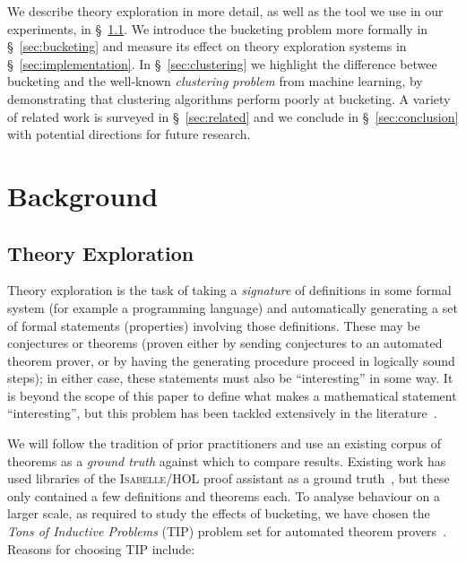 We describe theory exploration in more detail, as well as the \qspec{} tool we
use in our experiments, in \S~\ref{sec:theoryexploration}. We introduce the
bucketing problem more formally in \S~\ref{sec:bucketing} and measure its
effect on theory exploration systems in \S~\ref{sec:implementation}. In
\S~\ref{sec:clustering} we highlight the difference betwee bucketing and the
well-known \emph{clustering problem} from machine learning, by demonstrating
that clustering algorithms perform poorly at bucketing.  A variety of related
work is surveyed in \S~\ref{sec:related} and we conclude in
\S~\ref{sec:conclusion} with potential directions for future research.

\section{Background}
\label{sec:background}

\subsection{Theory Exploration}
\label{sec:theoryexploration}

Theory exploration is the task of taking a \emph{signature} of definitions in
some formal system (for example a programming language) and automatically
generating a set of formal statements (properties) involving those
definitions. These may be conjectures or theorems (proven either by sending
conjectures to an automated theorem prover, or by having the generating
procedure proceed in logically sound steps); in either case, these statements
must also be ``interesting'' in some way. It is beyond the scope of this paper
to define what makes a mathematical statement ``interesting'', but this problem
has been tackled extensively in the literature~\cite{colton2000notion}.

We will follow the tradition of prior practitioners and use an existing
corpus of theorems as a \emph{ground truth} against which to compare results.
Existing work has used libraries of the \textsc{Isabelle/HOL} proof assistant as
a ground
truth~\cite{Montano-Rivas.McCasland.Dixon.ea:2012,johansson2009isacosy,claessen2013automating},
but these only contained a few definitions and theorems each. To analyse
behaviour on a larger scale, as required to study the effects of bucketing, we
have chosen the \emph{Tons of Inductive Problems} (TIP) problem set for
automated theorem provers~\cite{claessen2015tip}.  Reasons for choosing TIP
include:

